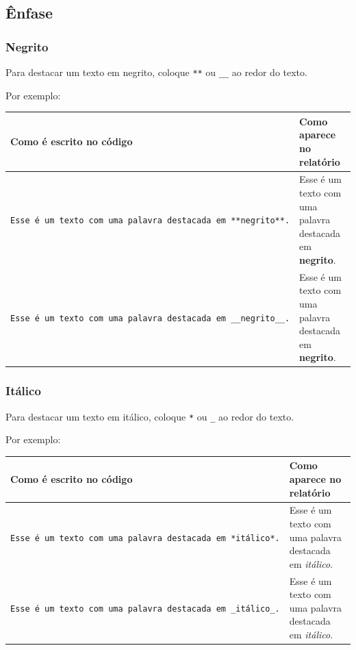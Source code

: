 \documentclass[
]{book}
\begin{document}
\hypertarget{uxeanfase}{%
\subsection{Ênfase}\label{uxeanfase}}

\hypertarget{negrito}{%
\subsubsection*{Negrito}\label{negrito}}

Para destacar um texto em negrito, coloque \texttt{**} ou \texttt{\_\_} ao redor do texto.

Por exemplo:

\begin{longtable}[]{@{}
  >{\raggedleft\arraybackslash}p{}
  >{\raggedleft\arraybackslash}p{}@{}}
\toprule
Como é escrito no código & Como aparece no relatório \\
\midrule
\endhead
\texttt{Esse\ é\ um\ texto\ com\ uma\ palavra\ destacada\ em\ **negrito**.} & Esse é um texto com uma palavra destacada em \textbf{negrito}. \\
\texttt{Esse\ é\ um\ texto\ com\ uma\ palavra\ destacada\ em\ \_\_negrito\_\_.} & Esse é um texto com uma palavra destacada em \textbf{negrito}. \\
\bottomrule
\end{longtable}

\hypertarget{ituxe1lico}{%
\subsubsection*{Itálico}\label{ituxe1lico}}

Para destacar um texto em itálico, coloque \texttt{*} ou \texttt{\_} ao redor do texto.

Por exemplo:

\begin{longtable}[]{@{}
  >{\raggedleft\arraybackslash}p{}
  >{\raggedleft\arraybackslash}p{}@{}}
\toprule
Como é escrito no código & Como aparece no relatório \\
\midrule
\endhead
\texttt{Esse\ é\ um\ texto\ com\ uma\ palavra\ destacada\ em\ *itálico*.} & Esse é um texto com uma palavra destacada em \emph{itálico}. \\
\texttt{Esse\ é\ um\ texto\ com\ uma\ palavra\ destacada\ em\ \_itálico\_.} & Esse é um texto com uma palavra destacada em \emph{itálico}. \\
\bottomrule
\end{longtable}
\end{document}
